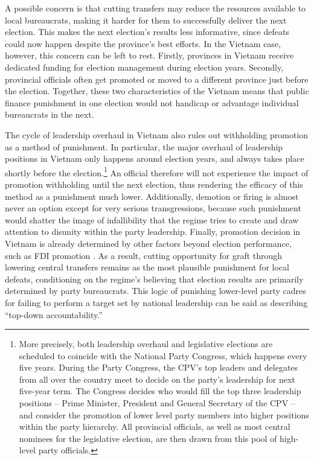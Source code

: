 \documentclass[12pt]{article}\usepackage[]{graphicx}\usepackage[]{color}
\newcommand{\1}{\mathbbm{1}}
\begin{document}
A possible concern is that cutting transfers may reduce the resources available to local bureaucrats, making it harder for them to successfully deliver the next election. This makes the next election's results less informative, since defeats could now happen despite the province's best efforts. In the Vietnam case, however, this concern can be left to rest. Firstly, provinces in Vietnam receive dedicated funding for election management during election years. Secondly, provincial officials often get promoted or moved to a different province just before the election. Together, these two characteristics of the Vietnam means that public finance punishment in one election would not handicap or advantage individual bureaucrats in the next.

The cycle of leadership overhaul in Vietnam also rules out withholding promotion as a method of punishment. In particular, the major overhaul of leadership positions in Vietnam only happens around election years, and always takes place shortly before the election.\footnote{More precisely, both leadership overhaul and legislative elections are scheduled to coincide with the National Party Congress, which happens every five years. During the Party Congress, the CPV's top leaders and delegates from all over the country meet to decide on the party's leadership for next five-year term. The Congress decides who would fill the top three leadership positions -- Prime Minister, President and General Secretary of the CPV -- and consider the promotion of lower level party members into higher positions within the party hierarchy. All provincial officials, as well as most central nominees for the legislative election, are then drawn from this pool of high-level party officials.} An official therefore will not experience the impact of promotion withholding until the next election, thus rendering the efficacy of this method as a punishment much lower. Additionally, demotion or firing is almost never an option except for very serious transgressions, because such punishment would shatter the image of infallibility that the regime tries to create and draw attention to disunity within the party leadership. Finally, promotion decision in Vietnam is already determined by other factors beyond election performance, such as FDI promotion \citep{JensenMalesky2015}. As a result, cutting opportunity for graft through lowering central transfers remains as the most plausible punishment for local defeats, conditioning on the regime’s believing that election results are primarily determined by party bureaucrats. This logic of punishing lower-level party cadres for failing to perform a target set by national leadership can be said as describing “top-down accountability.”
\end{document}
